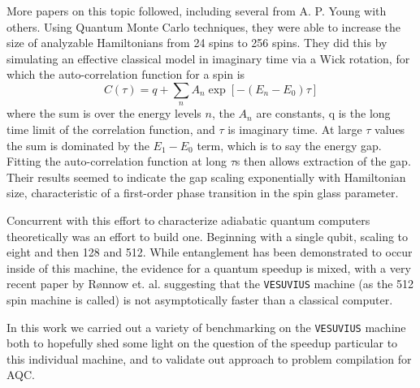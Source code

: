 More papers on this topic followed, including several from A. P. Young with others.\cite{young3}\cite{young2}\cite{young1}  Using Quantum Monte Carlo techniques, they were able to increase the size of analyzable Hamiltonians from 24 spins to 256 spins.  They did this by simulating an effective classical model in imaginary time via a Wick rotation, for which the auto-correlation function for a spin is
\begin{equation}
	C(\tau) = q + \sum_n A_n \exp[-(E_n - E_0)\tau]
\end{equation}
where the sum is over the energy levels $n$, the $A_n$ are constants, q is the long time limit of the correlation function, and $\tau$ is imaginary time.  At large $\tau$ values the sum is dominated by the $E_1 - E_0$ term, which is to say the energy gap.  Fitting the auto-correlation function at long $\tau$s then allows extraction of the gap.\cite{young1}
Their results seemed to indicate the gap scaling exponentially with Hamiltonian size, characteristic of a first-order phase transition in the spin glass parameter.\cite{young2}

Concurrent with this effort to characterize adiabatic quantum computers theoretically was an effort to build one.  Beginning with a single qubit\cite{qubit}, scaling to eight\cite{PhysRevB.82.024511} and then 128\cite{boixo2} and 512.\cite{pudenz}  While entanglement has been demonstrated to occur inside of this machine\cite{lanting}, the evidence for a quantum speedup is mixed,\cite{pudenz}\cite{boixo}\cite{smolin} with a very recent paper by R{\o}nnow et. al. suggesting that the \texttt{VESUVIUS} machine (as the 512 spin machine is called) is not asymptotically faster than a classical computer.

In this work we carried out a variety of benchmarking on the \texttt{VESUVIUS} machine both to hopefully shed some light on the question of the speedup particular to this individual machine, and to validate out approach to problem compilation for AQC.
